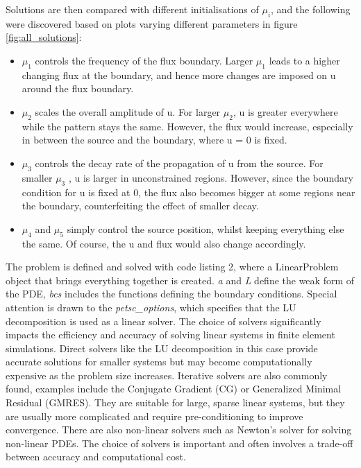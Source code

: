 Solutions are then compared with different initialisations of $\mu_i$, and the following were discovered based on plots varying different parameters in figure \ref{fig:all_solutions}:

\begin{itemize}
    \item $\mu_1$ controls the frequency of the flux boundary. Larger $\mu_1$ leads to a higher changing flux at the boundary, and hence more changes are imposed on u around the flux boundary.   
    \item $\mu_2$ scales the overall amplitude of u. For larger $\mu_2$, u is greater everywhere while the pattern stays the same. However, the flux would increase, especially in between the source and the boundary, where u = 0 is fixed. 
    \item $\mu_3$ controls the decay rate of the propagation of u from the source. For smaller $\mu_3$ , u is larger in unconstrained regions. However, since the boundary condition for u is fixed at 0, the flux also becomes bigger at some regions near the boundary, counterfeiting the effect of smaller decay.  
    \item $\mu_4$ and $\mu_5$ simply control the source position, whilst keeping everything else the same. Of course, the u and flux would also change accordingly. 

\end{itemize}

The problem is defined and solved with code listing 2, where a LinearProblem object that brings everything together is created. \textit{a} and \textit{L} define the weak form of the PDE, \textit{bcs} includes the functions defining the boundary conditions. Special attention is drawn to the \textit{petsc\_options}, which specifies that the LU decomposition is used as a linear solver. The choice of solvers significantly impacts the efficiency and accuracy of solving linear systems in finite element simulations. Direct solvers like the LU decomposition in this case provide accurate solutions for smaller systems but may become computationally expensive as the problem size increases. Iterative solvers are also commonly found, examples include the Conjugate Gradient (CG) or Generalized Minimal Residual (GMRES). They are suitable for large, sparse linear systems, but they are usually more complicated and require pre-conditioning to improve convergence. There are also non-linear solvers such as Newton's solver for solving non-linear PDEs. The choice of solvers is important and often involves a trade-off between accuracy and computational cost.

